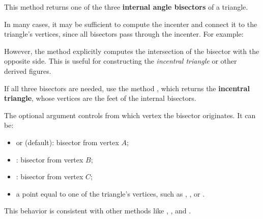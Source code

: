 This method returns one of the three \textbf{internal angle bisectors} of a triangle.

\medskip

In many cases, it may be sufficient to compute the incenter and connect it to the triangle’s vertices, since all bisectors pass through the incenter. For example:
\begin{mybox}
\end{mybox}


However, the method  explicitly computes the intersection of the bisector with the opposite side. This is useful for constructing the \emph{incentral triangle} or other derived figures.

\medskip

If all three bisectors are needed, use the method , which returns the \textbf{incentral triangle}, whose vertices are the feet of the internal bisectors.

\medskip

The optional argument  controls from which vertex the bisector originates. It can be:
\begin{itemize}
  \item {} or  (default): bisector from vertex $A$;
  \item {}: bisector from vertex $B$;
  \item {}: bisector from vertex $C$;
  \item a point equal to one of the triangle’s vertices, such as , , or .
\end{itemize}


This behavior is consistent with other methods like , , and .

